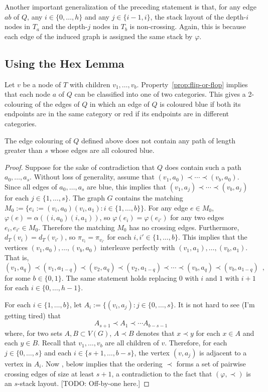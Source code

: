 \documentclass[kpfonts]{patmorin}
\newcommand{\pref}[1]{Property~\ref{prop:#1}}
\begin{document}
Another important generalization of the preceding statement is that, for any edge $ab$ of $Q$, any $i\in\{0,\ldots,h\}$ and any $j\in\{i-1,i\}$, the stack layout of the depth-$i$ nodes in $T_a$ and the depth-$j$ nodes in $T_b$ is non-crossing.  Again, this is because each edge of the induced graph is assigned the same stack by $\varphi$.

\subsection{Using the Hex Lemma}

Let $v$ be a node of $T$ with children $v_1,\ldots,v_b$. \pref{flip-or-flop} implies that each node $a$ of $Q$ can be classified into one of two categories.  This gives a 2-colouring of the edges of $Q$ in which an edge of $Q$ is coloured blue if both its endpoints are in the same category or red if its endpoints are in different categories.

\begin{lem}
    The edge colouring of $Q$ defined above does not contain any path of length greater than $s$ whose edges are all coloured blue.
\end{lem}

\begin{proof}
    Suppose for the sake of contradiction that $Q$ does contain such a path $a_0,\ldots,a_{s}$.  Without loss of generality, assume that $(v_1,a_0)\prec\cdots\prec (v_b,a_0)$.  Since all edges of $a_0,\dots,a_s$ are blue, this implies that $(v_1,a_j)\prec\cdots\prec (v_b,a_j)$ for each $j\in\{1,\ldots,s\}$.   The graph $G$ contains the matching $M_{0}:=\{e_i:=(v_i,a_0)(v_i,a_{1}):i\in\{1,\ldots,b\}\}$. For any edge $e\in M_0$, $\varphi(e)=\alpha((i,a_0)(i,a_1))$, so   $\varphi(e_i)=\varphi(e_{i'})$ for any two edges $e_i,e_{i'}\in M_0$.
    Therefore the matching $M_0$ has no crossing edges.  Furthermore, $d_T(v_i)=d_T(v_{i'})$, so  $\pi_{v_i}=\pi_{v_{i'}}$ for each $i,i'\in\{1,\ldots,b\}$. This implies that the vertices $(v_1,a_0),\ldots,(v_b,a_0)$ interleave perfectly with $(v_1,a_1),\ldots,(v_b,a_1)$.  That is,
    \[
        (v_1,a_{q}) \prec (v_1,a_{1-q}) \prec
        (v_2,a_{q}) \prec (v_2,a_{1-q}) \prec \cdots \prec
        (v_b,a_{q}) \prec (v_b,a_{1-q}) \enspace ,
    \]
    for some $b\in\{0,1\}$.  The same statement holds replacing $0$ with $i$ and $1$ with $i+1$ for each $i\in \{0,\ldots,h-1\}$.

    For each $i\in\{1,\ldots,b\}$, let $A_i:=\{(v_i,a_j): j\in\{0,\ldots,s\}$. It is not hard to see (I'm getting tired) that
    \[ A_{s+1}\prec A_1\prec \cdots A_{b-s-1} \]
    where, for two sets $A,B\subset V(G)$, $A\prec B$ denotes that $x\prec y$ for each $x\in A$ and each $y\in B$.  Recall that $v_1,\ldots,v_b$ are all children of $v$.  Therefore, for each $j\in\{0,\ldots,s\}$ and each $i\in\{s+1,\ldots,b-s\}$, the vertex $(v,a_j)$ is adjacent to a vertex in $A_i$.  Now , below implies that the ordering $\prec$ forms a set of pairwise crossing edges of size at least $s+1$, a contradiction to the fact that $(\varphi,\prec)$ is an $s$-stack layout. [TODO: Off-by-one here.]
\end{proof}
\end{document}
